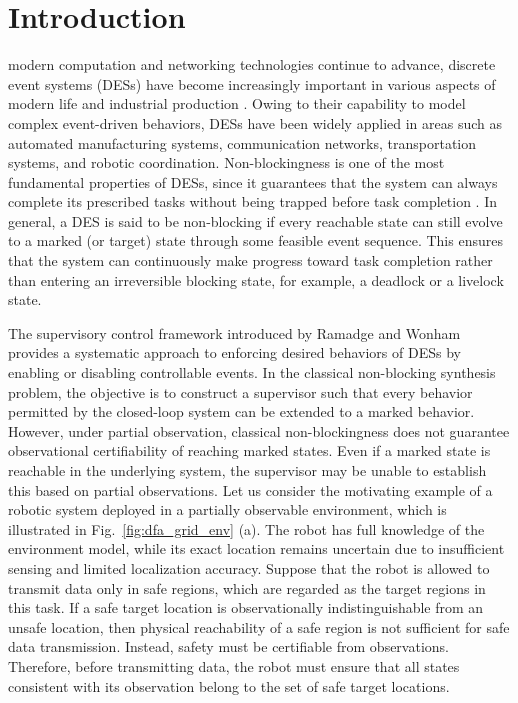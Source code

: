 \documentclass[journal,twoside,web]{ieeecolor}
\begin{document}
\section{Introduction}
\label{sec:intro}
 modern computation and networking technologies continue to advance, discrete event systems (DESs) have become increasingly important in various aspects of modern life and industrial production \cite{yin2024formal, fokkink2024offline}.
Owing to their capability to model complex event-driven behaviors, DESs have been widely applied in areas such as automated manufacturing systems, communication networks, transportation systems, and robotic coordination.
%
Non-blockingness is one of the most fundamental properties of DESs, since it guarantees that the system can always complete its prescribed tasks without being trapped before task completion \cite{cassandras2021introduction}.
In general, a DES is said to be non-blocking if every reachable state can still evolve to a marked (or target) state through some feasible event sequence.
This ensures that the system can continuously make progress toward task completion rather than entering an irreversible blocking state, for example, a deadlock or a livelock state.

%
The supervisory control framework introduced by Ramadge and Wonham \cite{ramadge1987supervisory} provides a systematic approach to enforcing desired behaviors of DESs by enabling or disabling controllable events.
In the classical non-blocking synthesis problem, the objective is to construct a supervisor such that every behavior permitted by the closed-loop system can be extended to a marked behavior.
%
However, under partial observation, classical non-blockingness does not guarantee observational certifiability of reaching marked states. Even if a marked state is reachable in the underlying system, the supervisor may be unable to establish this based on partial observations.
%
Let us consider the motivating example of a robotic system deployed in a partially observable environment, which is illustrated in Fig.~\ref{fig:dfa_grid_env} (a). 
The robot has full knowledge of the environment model, while its exact location remains uncertain due to insufficient sensing and limited localization accuracy.
Suppose that the robot is allowed to transmit data only in safe regions, which are regarded as the target regions in this task. 
If a safe target location is observationally indistinguishable from an unsafe location, then physical reachability of a safe region is not sufficient for safe data transmission.
Instead, safety must be certifiable from observations.
Therefore, before transmitting data, the robot must ensure that all states consistent with its observation belong to the set of safe target locations.
\end{document}
